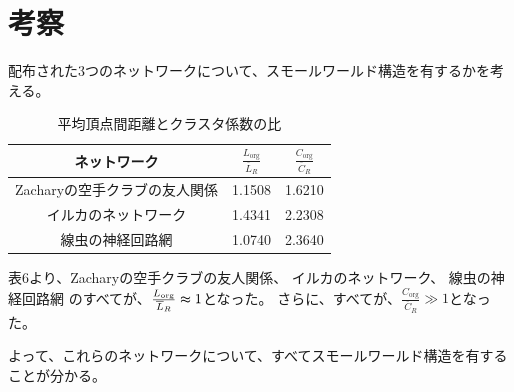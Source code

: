 \documentclass[12pt]{jarticle}
\begin{document}
\clearpage
\section{考察}
配布された3つのネットワークについて、スモールワールド構造を有するかを考える。
\begin{table}[htb]
    \caption{平均頂点間距離とクラスタ係数の比}
    \begin{center}
        \begin{tabular}{|c||c|c|}
            \hline
            ネットワーク                  & $\frac{L_{\text{org}}}{\overline{L}_{R}}$ & $\frac{C_{\text{org}}}{\overline{C}_{R}}$ \\ \hline \hline
            Zacharyの空手クラブの友人関係 & 1.1508                                    & 1.6210                                    \\ \hline
            イルカのネットワーク          & 1.4341                                    & 2.2308                                    \\ \hline
            線虫の神経回路網              & 1.0740                                    & 2.3640                                    \\ \hline
        \end{tabular}
    \end{center}
\end{table}

表6より、Zacharyの空手クラブの友人関係、
イルカのネットワーク、
線虫の神経回路網
のすべてが、$\frac{L_{\text{org}}}{\overline{L}_{R}}\thickapprox 1$となった。
さらに、すべてが、$\frac{C_{\text{org}}}{\overline{C}_{R}} \gg 1$となった。

よって、これらのネットワークについて、すべてスモールワールド構造を有することが分かる。
\clearpage
\appendix

\end{document}

